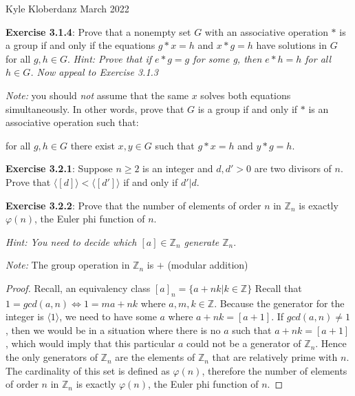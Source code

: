 \documentclass[a4paper]{article}
\begin{document}
\begin{myparindent}{0pt}

Kyle Kloberdanz  March 2022 \newline

\textbf{Exercise 3.1.4}:
Prove that a nonempty set $G$ with an associative operation $*$ is a group if
and only if the equations $g * x = h$ and $x * g = h$ have solutions in $G$
for all $g, h \in G$. \textit{Hint: Prove that if $e * g = g$ for some g, then
$e * h = h$ for all $h \in G$. Now appeal to Exercise 3.1.3} \newline

\textit{Note:} you should \textit{not} assume that the same $x$ solves both
equations simultaneously. In other words, prove that $G$ is a group if and only
if $*$ is an associative operation such that: \newline

for all $g, h \in G$ there exist $x, y \in G$ such that $g * x = h$ and $y * g = h$.
\newline

\textbf{Exercise 3.2.1}:
Suppose $n \ge 2$ is an integer and $d, d' > 0$ are two divisors of $n$. Prove
that $\langle [d] \rangle < \langle [d'] \rangle$ if and only if $d'|d$.
\newline

\textbf{Exercise 3.2.2}:
Prove that the number of elements of order $n$ in $\mathbb{Z}_n$ is exactly
$\varphi(n)$, the Euler phi function of $n$.

\textit{Hint: You need to decide which $[a] \in \mathbb{Z}_n$ generate $\mathbb{Z}_n$}.
\newline

\textit{Note:} The group operation in $\mathbb{Z}_n$ is $+$ (modular addition)
\newline

\begin{proof}
  Recall, an equivalency class $[a]_n = \{ a + nk | k \in \mathbb{Z} \}$
  Recall that $1 = gcd(a, n) \iff 1 = ma + nk$ where $a, m, k \in \mathbb{Z}$.
  Because the generator for the integer is $\langle 1 \rangle$, we need to have
  some $a$ where $a + nk = [a + 1]$. If $gcd(a, n) \neq 1$, then we would be in
  a situation where there is no $a$ such that $a + nk = [a + 1]$, which would
  imply that this particular $a$ could not be a generator of $\mathbb{Z}_n$.
  Hence the only generators of $\mathbb{Z}_n$ are the elements of $\mathbb{Z}_n$
  that are relatively prime with $n$. The cardinality of this set is defined as
  $\varphi(n)$, therefore the number of elements of order $n$ in $\mathbb{Z}_n$
  is exactly $\varphi(n)$, the Euler phi function of $n$.
\end{proof}


\end{myparindent}
\end{document}
